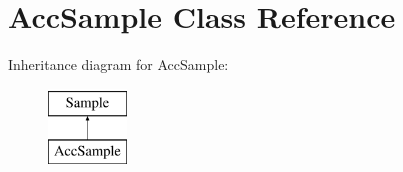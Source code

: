 \hypertarget{class_acc_sample}{\section{\-Acc\-Sample \-Class \-Reference}
\label{class_acc_sample}
}
\-Inheritance diagram for \-Acc\-Sample\-:\begin{figure}[H]
\begin{center}
\leavevmode
\includegraphics[height=2.000000cm]{class_acc_sample}
\end{center}
\end{figure}
